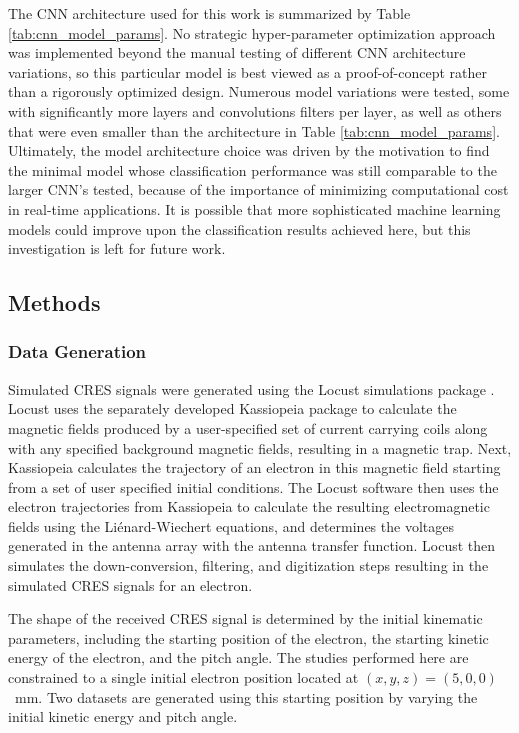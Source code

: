 The CNN architecture used for this work is summarized by Table \ref{tab:cnn_model_params}. No strategic hyper-parameter optimization approach was implemented beyond the manual testing of different CNN architecture variations, so this particular model is best viewed as a proof-of-concept rather than a rigorously optimized design. Numerous model variations were tested, some with significantly more layers and convolutions filters per layer, as well as others that were even smaller than the architecture in Table \ref{tab:cnn_model_params}. Ultimately, the model architecture choice was driven by the motivation to find the minimal model whose classification performance was still comparable to the larger CNN's tested, because of the importance of minimizing computational cost in real-time applications. It is possible that more sophisticated machine learning models could improve upon the classification results achieved here, but this investigation is left for future work.


\subsection{Methods}
\label{sec:method}

\subsubsection{Data Generation}
\label{sec:datasets}
Simulated CRES signals were generated using the Locust simulations package \cite{p8locustpaper, nb_thesis}. Locust uses the separately developed Kassiopeia package \cite{kassiopeia} to calculate the magnetic fields produced by a user-specified set of current carrying coils along with any specified background magnetic fields, resulting in a magnetic trap. Next, Kassiopeia calculates the trajectory of an electron in this magnetic field starting from a set of user specified initial conditions. The Locust software then uses the electron trajectories from Kassiopeia to calculate the resulting electromagnetic fields using the Li\'{e}nard-Wiechert equations, and determines the voltages generated in the antenna array with the antenna transfer function. Locust then simulates the down-conversion, filtering, and digitization steps resulting in the simulated CRES signals for an electron.

The shape of the received CRES signal is determined by the initial kinematic parameters, including the starting position of the electron, the starting kinetic energy of the electron, and the pitch angle. The studies performed here are constrained to a single initial electron position located at $(x,y,z)=(5, 0, 0)$~mm. Two datasets are generated using this starting position by varying the initial kinetic energy and pitch angle. 

